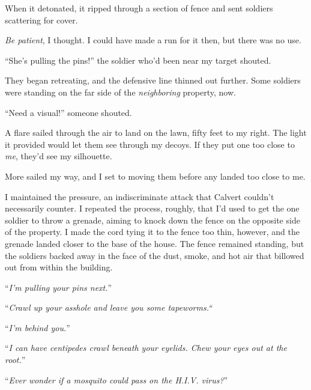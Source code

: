 When it detonated, it ripped through a section of fence and sent soldiers scattering for cover.



\emph{Be patient}, I thought.  I could have made a run for it then, but there was no use.



``She's pulling the pins!'' the soldier who'd been near my target shouted.



They began retreating, and the defensive line thinned out further.  Some soldiers were standing on the far side of the \emph{neighboring} property, now.



``Need a visual!'' someone shouted.



A flare sailed through the air to land on the lawn, fifty feet to my right.  The light it provided would let them see through my decoys.  If they put one too close to \emph{me}, they'd see my silhouette.



More sailed my way, and I set to moving them before any landed too close to me.



I maintained the pressure, an indiscriminate attack that Calvert couldn't necessarily counter.  I repeated the process, roughly, that I'd used to get the one soldier to throw a grenade, aiming to knock down the fence on the opposite side of the property.  I made the cord tying it to the fence too thin, however, and the grenade landed closer to the base of the house.  The fence remained standing, but the soldiers backed away in the face of the dust, smoke, and hot air that billowed out from within the building.



``\emph{I'm pulling your pins next.}''



``\emph{Crawl up your asshole and leave you some tapeworms.}\emph{``}



``\emph{I'm behind you.}''



``\emph{I can have centipedes crawl beneath your eyelids.  Chew your eyes out at the root.}''



``\emph{Ever wonder if a mosquito could pass on the H.I.V. virus?}''



